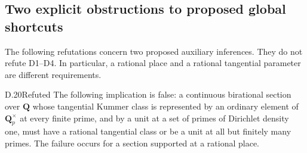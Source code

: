 \subsection{Two explicit obstructions to proposed global shortcuts}

The following refutations concern two proposed auxiliary inferences.
They do not refute D1--D4. In particular, a rational place and a rational
tangential parameter are different requirements.

\begin{claim}{D.20}{Refuted}\label{clm:D20}
The following implication is false: a continuous birational section over
$\mathbf Q$ whose tangential Kummer class is represented by an ordinary
element of $\mathbf Q_p^\times$ at every finite prime, and by a unit at a
set of primes of Dirichlet density one, must have a rational tangential
class or be a unit at all but finitely many primes. The failure occurs
for a section supported at a rational place.
\end{claim}
